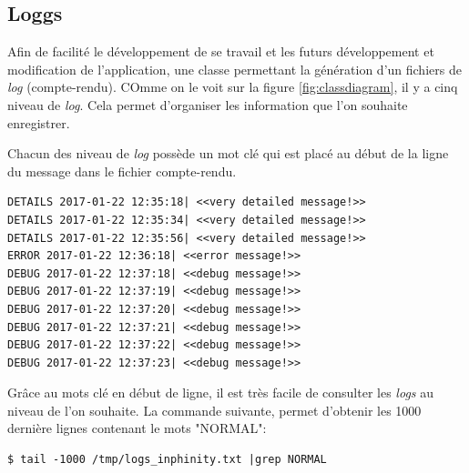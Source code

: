 \subsection{Loggs}
Afin de facilité le développement de se travail et les futurs développement et modification de l'application, une classe permettant la génération d'un fichiers de \emph{log} (compte-rendu). COmme on le voit sur la figure \ref{fig:classdiagram}, il y a cinq niveau de \emph{log}. Cela permet d'organiser les information que l'on souhaite enregistrer.

Chacun des niveau de \emph{log} possède un mot clé qui est placé au début de la ligne du message dans le fichier compte-rendu.

\lstset{language=bash}
\begin{lstlisting}[frame=single]
DETAILS 2017-01-22 12:35:18| <<very detailed message!>>
DETAILS 2017-01-22 12:35:34| <<very detailed message!>>
DETAILS 2017-01-22 12:35:56| <<very detailed message!>>
ERROR 2017-01-22 12:36:18| <<error message!>>
DEBUG 2017-01-22 12:37:18| <<debug message!>>
DEBUG 2017-01-22 12:37:19| <<debug message!>>
DEBUG 2017-01-22 12:37:20| <<debug message!>>
DEBUG 2017-01-22 12:37:21| <<debug message!>>
DEBUG 2017-01-22 12:37:22| <<debug message!>>
DEBUG 2017-01-22 12:37:23| <<debug message!>>
\end{lstlisting}

Grâce au mots clé en début de ligne, il est très facile de consulter les \emph{logs} au niveau de l'on souhaite. La commande suivante, permet d'obtenir les 1000 dernière lignes contenant le mots "NORMAL":

\begin{lstlisting}[frame=single]
$ tail -1000 /tmp/logs_inphinity.txt |grep NORMAL
\end{lstlisting}













































